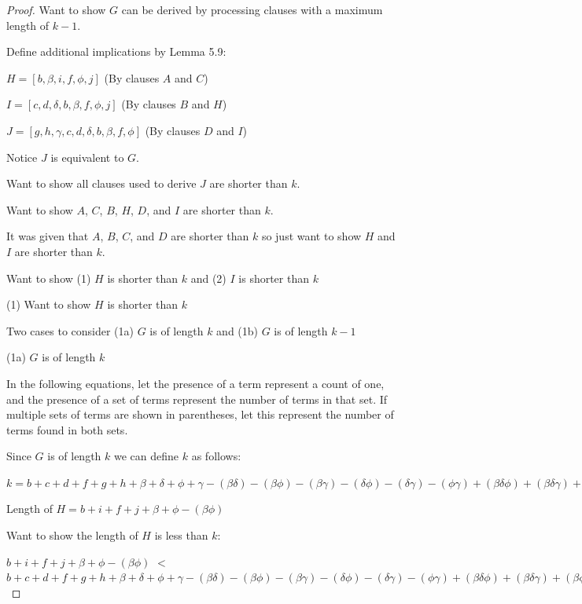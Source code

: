 \documentclass[manuscript]{acmart}
\begin{document}
\begin{proof}
        Want to show $G$ can be derived by processing clauses with a 
        maximum length of $k - 1$.

        Define additional implications by Lemma 5.9:

        $H = [b, \beta, i, f, \phi, j]$ (By clauses $A$ and $C$)

        $I = [c, d, \delta, b, \beta, f, \phi, j]$ (By clauses $B$ and $H$)

        $J = [g, h, \gamma, c, d, \delta, b, \beta, f, \phi]$ (By clauses $D$ and $I$)

        Notice $J$ is equivalent to $G$.

        Want to show all clauses used to derive $J$ are shorter than $k$.

        Want to show $A$, $C$, $B$, $H$, $D$, and $I$ are shorter than $k$.

        It was given that $A$, $B$, $C$, and $D$ are shorter than $k$ so just want to show $H$ and $I$ are shorter than $k$.

        Want to show (1) $H$ is shorter than $k$ and (2) $I$ is shorter than $k$

        (1) Want to show $H$ is shorter than $k$

        Two cases to consider (1a) $G$ is of length $k$ and (1b) $G$ is of length $k - 1$

        (1a) $G$ is of length $k$

        In the following equations, let the presence of a term represent a count of one, and the presence of a set of terms represent the number of terms in that set. If multiple sets of terms are shown in parentheses, let this represent the number
        of terms found in both sets.

        Since $G$ is of length $k$ we can define $k$ as follows:

        $k = b + c + d + f + g + h
            + \beta + \delta + \phi + \gamma
            - (\beta \delta) - (\beta \phi) - (\beta \gamma) - (\delta \phi) - (\delta \gamma) -(\phi \gamma)
            + (\beta \delta \phi) + (\beta \delta \gamma) + (\beta \phi \gamma) + (\delta \phi \gamma)
            - (\beta \delta \phi \gamma)
        $

        Length of $H = b + i + f + j + \beta + \phi - (\beta \phi)$
        
        Want to show the length of $H$ is less than $k$:

        $b + i + f + j + \beta + \phi - (\beta \phi)$
        $<$
        $b + c + d + f + g + h
            + \beta + \delta + \phi + \gamma
            - (\beta \delta) - (\beta \phi) - (\beta \gamma) - (\delta \phi) - (\delta \gamma) -(\phi \gamma)
            + (\beta \delta \phi) + (\beta \delta \gamma) + (\beta \phi \gamma) + (\delta \phi \gamma)
            - (\beta \delta \phi \gamma)
        $


\end{proof}
\end{document}

